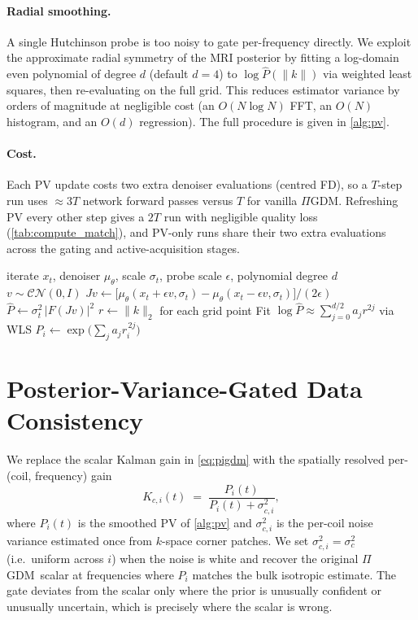 \documentclass[conference]{IEEEtran}
\newcommand{\xt}{x_t}
\newcommand{\sigt}{\sigma_t}
\newcommand{\PV}{\hat{P}}
\newcommand{\PIGDM}{$\Pi$GDM}
\begin{document}
\paragraph{Radial smoothing.} A single Hutchinson probe is too noisy
to gate per-frequency directly. We exploit the approximate radial
symmetry of the MRI posterior by fitting a log-domain even polynomial
of degree $d$ (default $d{=}4$) to $\log \PV(\|k\|)$ via weighted
least squares, then re-evaluating on the full grid. This reduces
estimator variance by orders of magnitude at negligible cost
(an $O(N \log N)$ FFT, an $O(N)$ histogram, and an
$O(d)$ regression). The full procedure is given in \cref{alg:pv}.

\paragraph{Cost.} Each PV update costs two extra denoiser evaluations
(centred FD), so a $T$-step run uses $\approx 3T$ network forward
passes versus $T$ for vanilla \PIGDM. Refreshing PV every other step
gives a $2T$ run with negligible quality loss
(\cref{tab:compute_match}), and PV-only runs share their two extra
evaluations across the gating and active-acquisition stages.

\begin{algorithm}[t]
\caption{\textsc{PV-Estimate} (per diffusion step)}
\label{alg:pv}
\begin{algorithmic}[1]
\Require iterate $\xt$, denoiser $\mu_\theta$, scale $\sigt$,
         probe scale $\epsilon$, polynomial degree $d$
\State $v \sim \mathcal{CN}(0,I)$ 
\State $J v \gets \bigl[\mu_\theta(\xt + \epsilon v,\sigt)
                       - \mu_\theta(\xt - \epsilon v,\sigt)\bigr] / (2\epsilon)$
\State $\PV \gets \sigt^{2}\,|F(Jv)|^{2}$ 
\State $r \gets \|k\|_2$ for each grid point
\State Fit $\log \PV \approx \sum_{j=0}^{d/2} a_j r^{2j}$ via WLS
\State \Return $P_i \gets \exp\!\bigl(\sum_j a_j r_i^{\,2j}\bigr)$
\end{algorithmic}
\end{algorithm}

\section{Posterior-Variance-Gated Data Consistency}\label{sec:pvgate}

We replace the scalar Kalman gain in \cref{eq:pigdm} with the
spatially resolved per-(coil, frequency) gain
\begin{equation}
  K_{c,i}(t) \;=\; \frac{P_i(t)}{P_i(t) + \sigma_{c,i}^{2}},
  \label{eq:pvgate}
\end{equation}
where $P_i(t)$ is the smoothed PV of \cref{alg:pv} and
$\sigma_{c,i}^{2}$ is the per-coil noise variance estimated once from
$k$-space corner patches. We set
$\sigma_{c,i}^{2} \!=\! \sigma_c^{2}$ (i.e.\ uniform across $i$) when
the noise is white and recover the original \PIGDM\ scalar at
frequencies where $P_i$ matches the bulk isotropic estimate. The gate
deviates from the scalar only where the prior is unusually confident
or unusually uncertain, which is precisely where the scalar is wrong.
\end{document}
